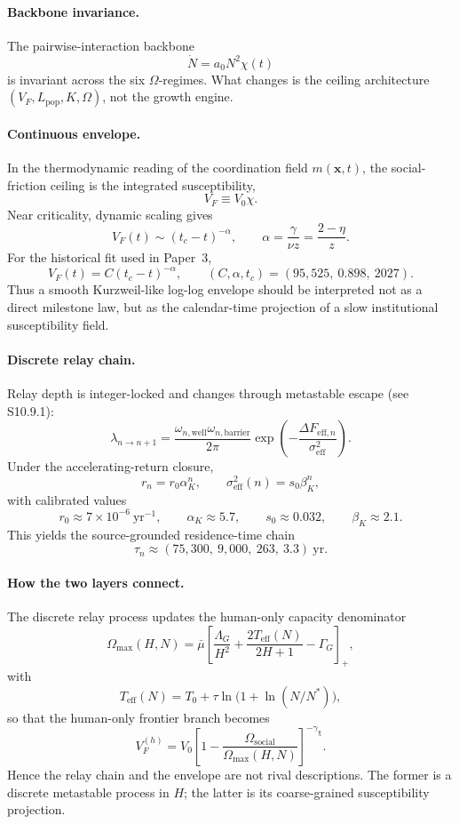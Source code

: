 \documentclass[11pt]{article}
\begin{document}
\paragraph{Backbone invariance.}
The pairwise-interaction backbone
\[
\dot N = a_0 N^2 \chi(t)
\]
is invariant across the six $\Omega$-regimes.
What changes is the ceiling architecture $(V_F,L_{\mathrm{pop}},K,\Omega)$, not the growth engine.

\paragraph{Continuous envelope.}
In the thermodynamic reading of the coordination field $m(\mathbf{x},t)$, the social-friction ceiling is the integrated susceptibility,
\[
V_F \equiv V_0 \chi .
\]
Near criticality, dynamic scaling gives
\[
V_F(t) \sim (t_c-t)^{-\alpha},
\qquad
\alpha = \frac{\gamma}{\nu z} = \frac{2-\eta}{z}.
\]
For the historical fit used in Paper~3,
\[
V_F(t)=C(t_c-t)^{-\alpha},
\qquad
(C,\alpha,t_c)=(95{,}525,\ 0.898,\ 2027).
\]
Thus a smooth Kurzweil-like log-log envelope should be interpreted not as a direct milestone law,
but as the calendar-time projection of a slow institutional susceptibility field.

\paragraph{Discrete relay chain.}
Relay depth is integer-locked and changes through metastable escape (see S10.9.1):
\[
\lambda_{n\to n+1}
=
\frac{\omega_{n,\mathrm{well}}\omega_{n,\mathrm{barrier}}}{2\pi}
\exp\!\left(-\frac{\Delta F_{\mathrm{eff},n}}{\sigma_{\mathrm{eff}}^2}\right).
\]
Under the accelerating-return closure,
\[
r_n=r_0\alpha_K^n,\qquad
\sigma_{\mathrm{eff}}^2(n)=s_0\beta_K^n,
\]
with calibrated values
\[
r_0 \approx 7\times 10^{-6}\ \mathrm{yr}^{-1},\qquad
\alpha_K\approx 5.7,\qquad
s_0\approx 0.032,\qquad
\beta_K\approx 2.1.
\]
This yields the source-grounded residence-time chain
\[
\tau_n \approx (75{,}300,\ 9{,}000,\ 263,\ 3.3)\ \mathrm{yr}.
\]

\paragraph{How the two layers connect.}
The discrete relay process updates the human-only capacity denominator
\[
\Omega_{\max}(H,N)
=
\bar\mu\!\left[
\frac{\Lambda_G}{H^2}
+\frac{2T_{\mathrm{eff}}(N)}{2H+1}
-\Gamma_G
\right]_+,
\]
with
\[
T_{\mathrm{eff}}(N)=T_0+\tau\ln\!\bigl(1+\ln(N/N^*)\bigr),
\]
so that the human-only frontier branch becomes
\[
V_F^{(h)}
=
V_0\left[1-\frac{\Omega_{\mathrm{social}}}{\Omega_{\max}(H,N)}\right]^{-\gamma_\chi}.
\]
Hence the relay chain and the envelope are not rival descriptions.
The former is a discrete metastable process in $H$; the latter is its coarse-grained susceptibility projection.
\end{document}
